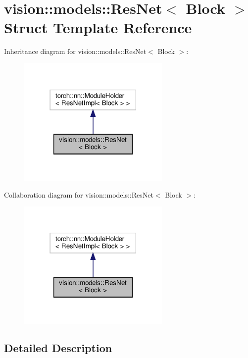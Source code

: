 \hypertarget{structvision_1_1models_1_1ResNet}{}\section{vision\+:\+:models\+:\+:Res\+Net$<$ Block $>$ Struct Template Reference}
\label{structvision_1_1models_1_1ResNet}


Inheritance diagram for vision\+:\+:models\+:\+:Res\+Net$<$ Block $>$\+:
\nopagebreak
\begin{figure}[H]
\begin{center}
\leavevmode
\includegraphics[width=210pt]{structvision_1_1models_1_1ResNet__inherit__graph}
\end{center}
\end{figure}


Collaboration diagram for vision\+:\+:models\+:\+:Res\+Net$<$ Block $>$\+:
\nopagebreak
\begin{figure}[H]
\begin{center}
\leavevmode
\includegraphics[width=210pt]{structvision_1_1models_1_1ResNet__coll__graph}
\end{center}
\end{figure}


\subsection{Detailed Description}
